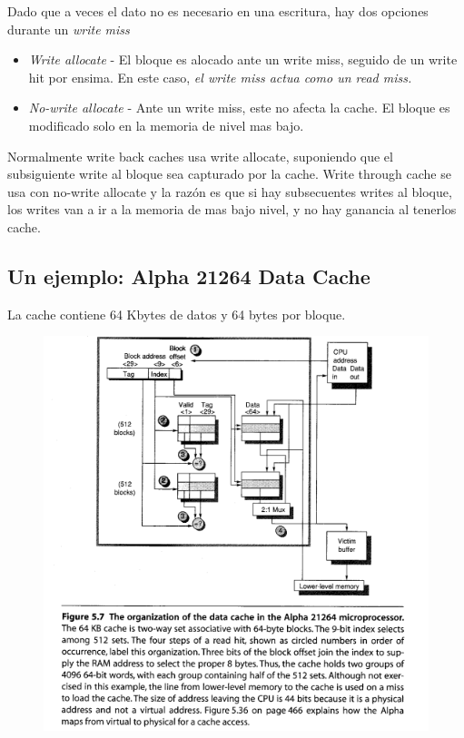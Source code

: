 \documentclass{article}
\begin{document}
Dado que a veces el dato no es necesario en una escritura, hay dos opciones durante un \textit{write miss}

\begin{itemize} 
    \item \textit{Write allocate} - El bloque es alocado ante un write miss, seguido de un write hit por ensima. En este caso, \textit{el write miss actua como un read miss.}
    \item \textit{No-write allocate} - Ante un write miss, este no afecta la cache. El bloque es modificado solo en la memoria de nivel mas bajo.
\end{itemize}

Normalmente write back caches usa write allocate, suponiendo que el subsiguiente write al bloque sea capturado por la cache.
Write through cache se usa con no-write allocate y la razón es que si hay subsecuentes writes al bloque, los writes van a ir a la memoria de mas bajo nivel, y no hay ganancia al tenerlos cache. 


\subsection{Un ejemplo: Alpha 21264 Data Cache}

La cache contiene 64 Kbytes de datos y 64 bytes por bloque.

\begin{figure}[h!]
    \includegraphics[width=\linewidth]{imagenes/Cache2WayAssosiativeAlpha.png}
\end{figure}
\end{document}
